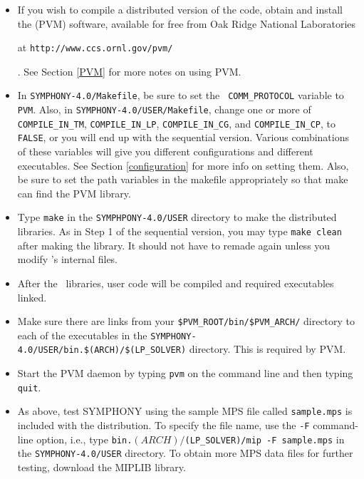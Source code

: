 \begin{itemize}
        \item If you wish to compile a distributed version of the code, obtain
and install the {\em {}} (PVM) software, available for free
from Oak Ridge National Laboratories
\begin{latexonly}
        at {\tt http://www.ccs.ornl.gov/pvm/}
\end{latexonly}. 
        See Section \ref{PVM} for more notes on using PVM.
        
        \item In \texttt{SYMPHONY-4.0/Makefile}, be sure to set the {\tt
        COMM\_PROTOCOL} variable to {\tt PVM}. Also, in
        \texttt{SYMPHONY-4.0/USER/Makefile}, change one or more of {\tt
        COMPILE\_IN\_TM}, {\tt COMPILE\_IN\_LP}, {\tt COMPILE\_IN\_CG}, and
        {\tt COMPILE\_IN\_CP}, to {\tt FALSE}, or you will end up with the
        sequential version. Various combinations of these variables will give
        you different configurations and different executables. See Section
        \ref{configuration} for more info on setting them. Also, be sure to
        set the path variables in the makefile appropriately so that make can
        find the PVM library.

        \item Type {\tt make} in the \texttt{SYMPHPONY-4.0/USER} directory to
        make the distributed libraries. As in Step 1 of the sequential
        version, you may type {\tt make clean} after making the
        library. It should not have to remade again unless you modify
        \BB's internal files.

        \item After the \BB\ libraries, user code will be compiled and
        required executables linked.

        \item Make sure there are links from your
        \texttt{\$PVM\_ROOT/bin/\$PVM\_ARCH/} directory to each of the
        executables in the
        \texttt{SYMPHONY-4.0/USER/bin.\$(ARCH)/\$(LP\_SOLVER)} directory. 
	This is required by PVM.

        \item Start the PVM daemon by typing {\tt pvm} on the command line
        and then typing {\tt quit}.

        \item As above, test SYMPHONY using the sample MPS file called
        \texttt{sample.mps} is included with the distribution. To specify the
        file name, use the \texttt{-F} command-line option, i.e., type
        \texttt{bin.$(ARCH)/$(LP\_SOLVER)/mip -F sample.mps} in the
        \texttt{SYMPHONY-4.0/USER} directory. To obtain more MPS data files
        for further testing, download the MIPLIB library.

\end{itemize}

